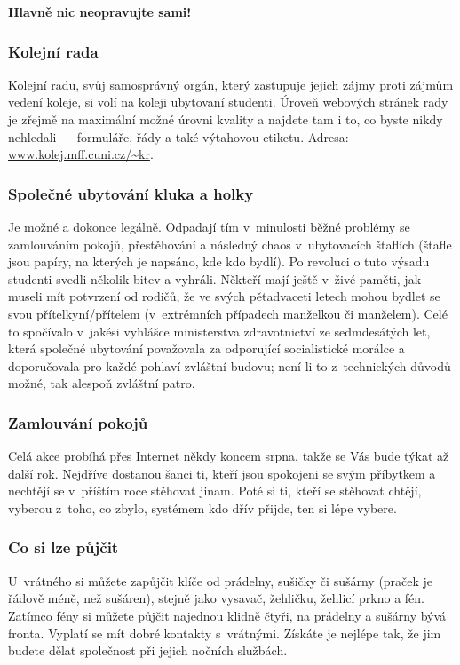 {\bf Hlavně nic neopravujte sami!\/}

\subsubsection{Kolejní rada}

Kolejní radu, svůj samosprávný orgán, který zastupuje jejich zájmy
proti zájmům vedení koleje, si volí na koleji ubytovaní studenti.
Úroveň webových stránek rady je zřejmě na maximální možné úrovni
kvality a najdete tam i to, co byste nikdy nehledali --- formuláře,
řády a také výtahovou etiketu. Adresa: \url{www.kolej.mff.cuni.cz/~kr}.

 \subsubsection{Společné ubytování kluka a holky}

Je možné a dokonce legálně. Odpadají tím v~minulosti běžné problémy
se zamlouváním pokojů, přestěhování  a následný chaos
v~ubytovacích štaflích (štafle jsou papíry, na kterých je napsáno,
kde kdo bydlí). Po revoluci o tuto výsadu studenti svedli několik
bitev a vyhráli. Někteří mají ještě v~živé paměti, jak museli mít
potvrzení od rodičů, že ve svých pětadvaceti letech mohou bydlet se svou
přítelkyní/přítelem (v~extrémních případech manželkou či manželem). Celé
to spo\-čí\-va\-lo v~jakési vyhlášce ministerstva zdravotnictví ze sedmdesátých
let, která společné ubytování považovala za odporující socialistické
morálce a doporučovala pro každé pohlaví zvláštní budovu; není-li to
z~technických důvodů možné, tak alespoň zvláštní patro.

\subsubsection{Zamlouvání pokojů}

Celá akce probíhá přes Internet někdy koncem srpna, takže se Vás
bude týkat až další rok. Nejdříve dostanou šanci ti, kteří jsou
spokojeni se svým příbytkem a nechtějí se v~příštím roce stěhovat
jinam. Poté si ti, kteří se stěhovat chtějí, vyberou z~toho, co
zbylo, systémem kdo dřív přijde, ten si lépe vybere.

\subsubsection{Co si lze půjčit}

U~vrátného si můžete zapůjčit klíče od prádelny, sušičky či
sušárny (praček je řádově méně, než sušáren), stejně jako vysavač,
žehličku, žehlicí prkno a fén. Zatímco fény si můžete půjčit
najednou klidně čtyři, na prádelny a sušárny bývá fronta. Vyplatí
se mít dobré kontakty s~vrátnými. Získáte je nejlépe tak, že jim
budete dělat společnost při jejich nočních službách.

